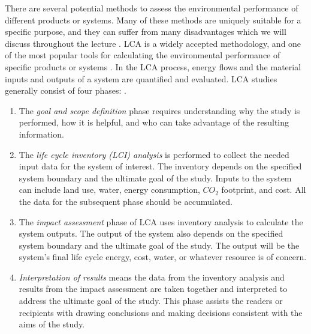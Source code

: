 \documentclass[10pt]{article}
\begin{document}
There are several potential methods to assess the environmental performance of different products or systems. Many of these methods are uniquely suitable for a specific purpose, and they can suffer from many disadvantages which we will discuss throughout the lecture \cite{crawford2003validation}. LCA is a widely accepted methodology, and one of the most popular tools for calculating the environmental performance of specific products or systems \cite{crawford2003validation}. In the LCA process, energy flows and the material inputs and outputs of a system are quantified and evaluated.  %
 LCA studies generally consist of four phases: %
 \cite{International_Organization_for_Standardization2006-gc}.  
 
 \vspace{-6pt}
\begin{enumerate}

\item  The \textit{goal and scope definition} phase requires understanding why the study is performed, how it is helpful, and who can take advantage of the resulting information. 
 
\item The \textit{life cycle inventory (LCI) analysis} is performed to collect the needed input data for the system of interest. The inventory depends on the specified system boundary and the ultimate goal of the study. Inputs to the system can include land use, water, energy consumption, $CO_2$ footprint, and cost. All the data for the subsequent phase should be accumulated. 

\item The \textit{impact assessment} phase of LCA uses inventory analysis to calculate the system outputs. The output of the system also depends on the specified system boundary and the ultimate goal of the study. The output will be the system's final life cycle energy, cost, water, or whatever resource is of concern. 

\item \textit{Interpretation of results} means the data from the inventory analysis and results from the impact assessment are taken together and interpreted to address the ultimate goal of the study. This phase assists the readers or recipients with drawing conclusions and making decisions consistent with the aims of the study.
\end{enumerate}
\vspace{-6pt}
\end{document}

